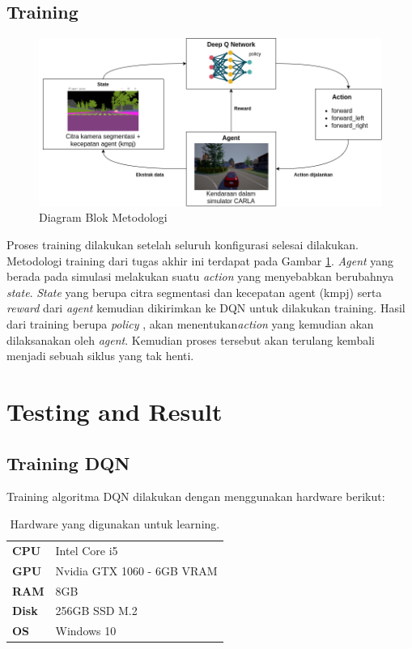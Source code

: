 \documentclass[conference]{IEEEtran}
\begin{document}
\subsection{Training}
\label{sec:training}

\begin{figure}[H] 
	\centering
	\includegraphics[width=1\linewidth]{images/metodologi}
	\caption{Diagram Blok Metodologi}
	\label{fig:blockdiagram}
\end{figure}

Proses training dilakukan setelah seluruh konfigurasi selesai dilakukan. Metodologi training dari tugas akhir ini terdapat pada Gambar \ref{fig:blockdiagram}. \textit{Agent} yang berada pada simulasi melakukan suatu \textit{action} yang menyebabkan berubahnya \textit{state}. \textit{State} yang berupa citra segmentasi dan kecepatan agent (kmpj) serta \textit{reward }dari \textit{agent} kemudian dikirimkan ke DQN untuk dilakukan training. Hasil dari training berupa \textit{policy },  akan menentukan\textit{action} yang kemudian akan dilaksanakan oleh \textit{agent}. Kemudian proses tersebut akan terulang kembali menjadi sebuah siklus yang tak henti.

	
	
	
	\section{Testing and Result}
	\subsection{Training DQN}
	\label{sec:training_dqn}
	Training algoritma DQN dilakukan dengan menggunakan hardware berikut:
	\begin{table}[H]
		\begin{tabular}{ll}
			\textbf{CPU}  & Intel Core i5              \\
			\textbf{GPU}  & Nvidia GTX 1060 - 6GB VRAM \\
			\textbf{RAM}  & 8GB                        \\
			\textbf{Disk} & 256GB SSD M.2              \\
			\textbf{OS}   & Windows 10                
		\end{tabular}
		\caption{Hardware yang digunakan untuk learning.}
		\label{tb:hardwaresetup}
	\end{table}
	
\end{document}
